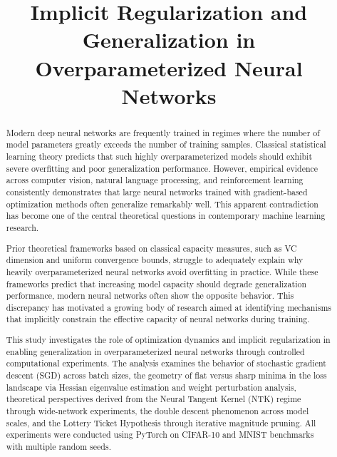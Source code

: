 \documentclass[conference]{IEEEtran}
\begin{document}
\title{Implicit Regularization and Generalization in Overparameterized Neural Networks}

\author{
}

\maketitle

\begin{abstract}
Modern deep neural networks are frequently trained in regimes where the number of model parameters greatly exceeds the number of training samples. Classical statistical learning theory predicts that such highly overparameterized models should exhibit severe overfitting and poor generalization performance. However, empirical evidence across computer vision, natural language processing, and reinforcement learning consistently demonstrates that large neural networks trained with gradient-based optimization methods often generalize remarkably well. This apparent contradiction has become one of the central theoretical questions in contemporary machine learning research.

Prior theoretical frameworks based on classical capacity measures, such as VC dimension and uniform convergence bounds, struggle to adequately explain why heavily overparameterized neural networks avoid overfitting in practice. While these frameworks predict that increasing model capacity should degrade generalization performance, modern neural networks often show the opposite behavior. This discrepancy has motivated a growing body of research aimed at identifying mechanisms that implicitly constrain the effective capacity of neural networks during training.

This study investigates the role of optimization dynamics and implicit regularization in enabling generalization in overparameterized neural networks through controlled computational experiments. The analysis examines the behavior of stochastic gradient descent (SGD) across batch sizes, the geometry of flat versus sharp minima in the loss landscape via Hessian eigenvalue estimation and weight perturbation analysis, theoretical perspectives derived from the Neural Tangent Kernel (NTK) regime through wide-network experiments, the double descent phenomenon across model scales, and the Lottery Ticket Hypothesis through iterative magnitude pruning. All experiments were conducted using PyTorch on CIFAR-10 and MNIST benchmarks with multiple random seeds.


\end{abstract}
\end{document}
